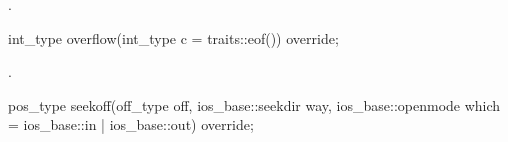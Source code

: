 \documentclass[ebook,11pt,article]{memoir}
\begin{document}
\begin{itemdescr}
\pnum
\returns
{}.
\end{itemdescr}

\begin{itemdecl}
int_type overflow(int_type c = traits::eof()) override;
\end{itemdecl}

\begin{itemdescr}
\pnum
\returns
{}.

\end{itemdescr}

\begin{itemdecl}
pos_type seekoff(off_type off, ios_base::seekdir way,
                 ios_base::openmode which
                   = ios_base::in | ios_base::out) override;
\end{itemdecl}
\end{document}
